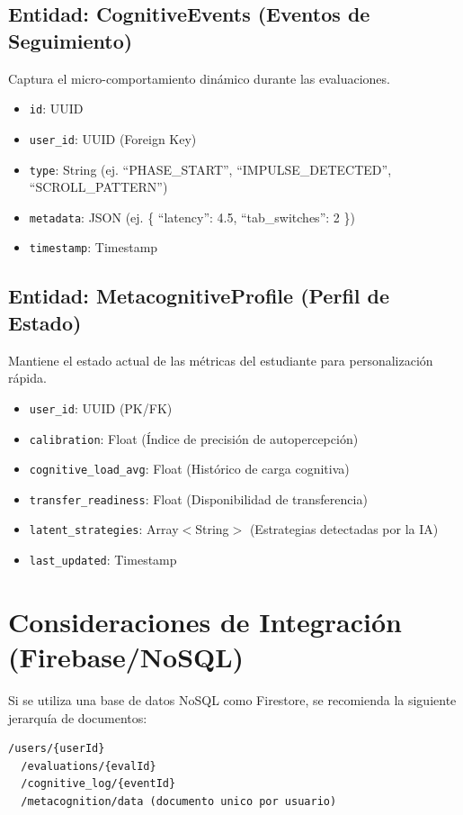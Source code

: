 \documentclass{article}
\begin{document}
\subsection{Entidad: CognitiveEvents (Eventos de Seguimiento)}
Captura el micro-comportamiento dinámico durante las evaluaciones.
\begin{itemize}
    \item \texttt{id}: UUID
    \item \texttt{user\_id}: UUID (Foreign Key)
    \item \texttt{type}: String (ej. ``PHASE\_START'', ``IMPULSE\_DETECTED'', ``SCROLL\_PATTERN'')
    \item \texttt{metadata}: JSON (ej. \{ ``latency'': 4.5, ``tab\_switches'': 2 \})
    \item \texttt{timestamp}: Timestamp
\end{itemize}

\subsection{Entidad: MetacognitiveProfile (Perfil de Estado)}
Mantiene el estado actual de las métricas del estudiante para personalización rápida.
\begin{itemize}
    \item \texttt{user\_id}: UUID (PK/FK)
    \item \texttt{calibration}: Float (Índice de precisión de autopercepción)
    \item \texttt{cognitive\_load\_avg}: Float (Histórico de carga cognitiva)
    \item \texttt{transfer\_readiness}: Float (Disponibilidad de transferencia)
    \item \texttt{latent\_strategies}: Array$<$String$>$ (Estrategias detectadas por la IA)
    \item \texttt{last\_updated}: Timestamp
\end{itemize}

\section{Consideraciones de Integración (Firebase/NoSQL)}
Si se utiliza una base de datos NoSQL como Firestore, se recomienda la siguiente jerarquía de documentos:
\begin{lstlisting}[basicstyle=\small\ttfamily, breaklines=true]
/users/{userId}
  /evaluations/{evalId}
  /cognitive_log/{eventId}
  /metacognition/data (documento unico por usuario)
\end{lstlisting}
\end{document}
